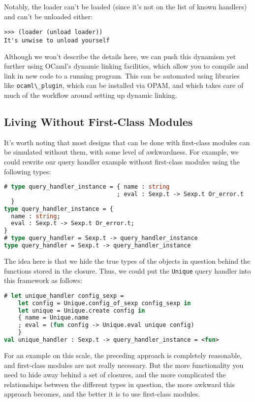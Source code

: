 Notably, the loader can't be loaded (since it's not on the list of known
handlers) and can't be unloaded either:

\begin{lstlisting}
>>> (loader (unload loader))
It's unwise to unload yourself
\end{lstlisting}

Although we won't describe the details here, we can push this dynamism
yet further using OCaml's dynamic linking facilities, which allow you to
compile and link in new code to a running program. This can be automated
using libraries like \passthrough{\lstinline!ocaml\_plugin!}, which can
be installed via OPAM, and which takes care of much of the workflow
around setting up dynamic linking. ~

\hypertarget{living-without-first-class-modules}{%
\subsection{Living Without First-Class
Modules}\label{living-without-first-class-modules}}

It's worth noting that most designs that can be done with first-class
modules can be simulated without them, with some level of awkwardness.
For example, we could rewrite our query handler example without
first-class modules using the following
types:

\begin{lstlisting}[language=Caml]
# type query_handler_instance = { name : string
                                ; eval : Sexp.t -> Sexp.t Or_error.t
  }
type query_handler_instance = {
  name : string;
  eval : Sexp.t -> Sexp.t Or_error.t;
}
# type query_handler = Sexp.t -> query_handler_instance
type query_handler = Sexp.t -> query_handler_instance
\end{lstlisting}

The idea here is that we hide the true types of the objects in question
behind the functions stored in the closure. Thus, we could put the
\passthrough{\lstinline!Unique!} query handler into this framework as
follows:

\begin{lstlisting}[language=Caml]
# let unique_handler config_sexp =
    let config = Unique.config_of_sexp config_sexp in
    let unique = Unique.create config in
    { name = Unique.name
    ; eval = (fun config -> Unique.eval unique config)
    }
val unique_handler : Sexp.t -> query_handler_instance = <fun>
\end{lstlisting}

For an example on this scale, the preceding approach is completely
reasonable, and first-class modules are not really necessary. But the
more functionality you need to hide away behind a set of closures, and
the more complicated the relationships between the different types in
question, the more awkward this approach becomes, and the better it is
to use first-class modules. ~
